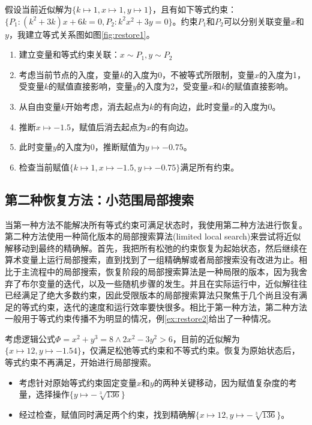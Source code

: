 \begin{example}
\label{ex:restore1}
假设当前近似解为$\{k \mapsto 1, x \mapsto 1, y \mapsto 1\}$，且有如下等式约束：$\{P_1: (k^2 + 3k) x + 6k = 0, P_2: k^2 x^2 + 3y = 0\}$。约束$P_1$和$P_2$可以分别关联变量$x$和$y$，我建立等式关系图如图\ref{fig:restore1}。
\begin{enumerate}
    \item 建立变量和等式约束关联：$x \sim P_1, y \sim P_2$
    \item 考虑当前节点的入度，变量$k$的入度为0，不被等式所限制，变量$x$的入度为1，受变量$k$的赋值直接影响，变量$y$的入度为2，受变量$x$和$k$的赋值直接影响。
    \item 从自由变量$k$开始考虑，消去起点为$k$的有向边，此时变量$x$的入度为0。
    \item 推断$x \mapsto -1.5$，赋值后消去起点为$x$的有向边。
    \item 此时变量$y$的入度为0，推断赋值为$y \mapsto -0.75$。
    \item 检查当前赋值$\{k \mapsto 1, x \mapsto -1.5, y \mapsto -0.75\}$满足所有约束。
\end{enumerate}
\end{example}


\subsection{第二种恢复方法：小范围局部搜索}
当第一种方法不能解决所有等式约束可满足状态时，我使用第二种方法进行恢复。第二种方法使用一种简化版本的局部搜索算法(limited local search)来尝试将近似解移动到最终的精确解。首先，我把所有松弛的约束恢复为起始状态，然后继续在算术变量上运行局部搜索，直到找到了一组精确解或者局部搜索没有改进为止。相比于主流程中的局部搜索，恢复阶段的局部搜索算法是一种局限的版本，因为我舍弃了布尔变量的迭代，以及一些随机步骤的发生。并且在实际运行中，近似解往往已经满足了绝大多数约束，因此受限版本的局部搜索算法只聚焦于几个尚且没有满足的等式约束，迭代的速度和运行效率要快很多。相比于第一种方法，第二种方法一般用于等式约束传播不为明显的情况，例\ref{ex:restore2}给出了一种情况。

\begin{example}
考虑逻辑公式$\Phi = x^2 + y^3 = 8 \wedge 2x^2 - 3y^2 > 6$，目前的近似解为$\{x \mapsto 12, y \mapsto -1.54\}$，仅满足松弛等式约束和不等式约束。恢复为原始状态后，等式约束不再满足，开始进行局部搜索。
\begin{itemize}
    \item 考虑针对原始等式约束固定变量$x$和$y$的两种关键移动，因为赋值复杂度的考量，选择操作$\{y \mapsto -\sqrt[3]{136}\}$
    \item 经过检查，赋值同时满足两个约束，找到精确解$\{x \mapsto 12, y \mapsto -\sqrt[3]{136}\}$。
\end{itemize}
\label{ex:restore2}
\end{example}

